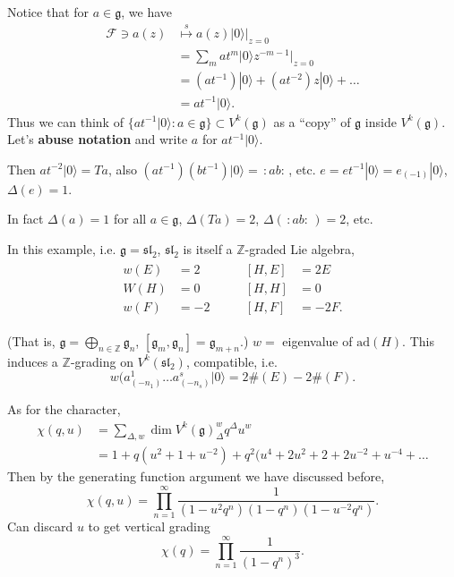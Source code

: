 Notice that for $a \in \mathfrak{g}$, we have
$$
\begin{aligned}
\mathcal{F}\ni a(z)&\overset{s}{\mapsto }
a(z)|0\rangle |_{z=0}\\
&=\sum_{m}at^m |0\rangle
z^{-m-1}\Big|_{z=0}\\
&=(at^{-1})|0\rangle+(at^{-2})z|0\rangle+
\ldots\\
&=at^{-1} |0\rangle.
\end{aligned}
$$
Thus we can think of
$\{a t^{-1} |0\rangle:a \in
\mathfrak{g}\}\subset V^k(\mathfrak{g})$
as a ``copy'' of $\mathfrak{g}$ inside
$V^k(\mathfrak{g})$.
Let's {\bf abuse notation} and write $a$ for
$at^{-1}|0\rangle$.

Then $at^{-2}|0\rangle=Ta$, also
$(at^{-1})(bt^{-1})|0\rangle=\,:\!ab\!:\,$,
etc.
$e=et^{-1}|0\rangle=e_{(-1)}|0\rangle$,
$\Delta(e)=1$.

In fact $\Delta(a)=1$ for all $a \in
\mathfrak{g}$,
$\Delta(Ta)=2$,
$\Delta(\,:\!ab\!:\,)=2$, etc.

In this example, i.e.
$\mathfrak{g}=\mathfrak{sl}_2$,
$\mathfrak{sl}_2$ is itself a
$\mathbb{Z}$-graded Lie algebra,
\begin{align*}
\begin{aligned}
w(E)&=2\\
W(H)&=0\\
w(F)&=-2
\end{aligned}
\qquad
\begin{aligned}
[H,E]&=2E\\
[H,H]&=0\\
[H,F]&=-2F.
\end{aligned}
\end{align*}

(That is, $\mathfrak{g}=\bigoplus_{n \in
\mathbb{Z}}\mathfrak{g}_n$,
$[\mathfrak{g}_m,\mathfrak{g}_n]=\mathfrak{g}
_{m+n}$.)
$w=$ eigenvalue of $\text{ad}(H)$.
This induces a $\mathbb{Z}$-grading on
$V^k(\mathfrak{sl}_2)$,
compatible, i.e.
$$
w(a^1_{(-n_1)}\ldots a^s_{(-n_s)}|0\rangle=
2\#(E)-2\#(F).
$$

\medskip\noindent
As for the character,
$$
\begin{aligned}
\chi(q,u)&=\sum_{\Delta,w}\dim
V^k(\mathfrak{g})_\Delta^w q^\Delta u^w\\
&=1+q(u^2+1+u^{-2})
+q^2(u^4+2u^2+2+2u^{-2}+u^{-4}+\ldots
\end{aligned}
$$
Then by the generating function argument we
have discussed
before,
$$
\chi(q,u)=\prod_{n=1}^\infty \frac{1}
{(1-u^2q^n)(1-q^n)(1-u^{-2}q^n)}.
$$
Can discard $u$ to get vertical grading
$$
\chi(q)=\prod_{n=1}^\infty
\frac{1}{(1-q^n)^3}.
$$

